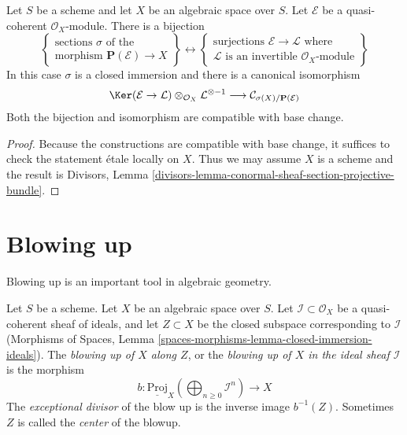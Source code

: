 \begin{lemma}
\label{lemma-conormal-sheaf-section-projective-bundle}
Let $S$ be a scheme and let $X$ be an algebraic space over $S$.
Let $\mathcal{E}$ be a quasi-coherent $\mathcal{O}_X$-module.
There is a bijection
$$
\left\{
\begin{matrix}
\text{sections }\sigma\text{ of the } \\
\text{morphism } \mathbf{P}(\mathcal{E}) \to X
\end{matrix}
\right\}
\leftrightarrow
\left\{
\begin{matrix}
\text{surjections }\mathcal{E} \to \mathcal{L}\text{ where} \\
\mathcal{L}\text{ is an invertible }\mathcal{O}_X\text{-module}
\end{matrix}
\right\}
$$
In this case $\sigma$ is a closed immersion and there is a canonical
isomorphism
$$
\Ker(\mathcal{E} \to \mathcal{L})
\otimes_{\mathcal{O}_X} \mathcal{L}^{\otimes -1}
\longrightarrow
\mathcal{C}_{\sigma(X)/\mathbf{P}(\mathcal{E})}
$$
Both the bijection and isomorphism are compatible with base change.
\end{lemma}

\begin{proof}
Because the constructions are compatible with base change, it suffices to
check the statement \'etale locally on $X$. Thus we may assume $X$ is
a scheme and the result is
Divisors, Lemma \ref{divisors-lemma-conormal-sheaf-section-projective-bundle}.
\end{proof}






\section{Blowing up}
\label{section-blowing-up}

\noindent
Blowing up is an important tool in algebraic geometry.

\begin{definition}
\label{definition-blow-up}
Let $S$ be a scheme. Let $X$ be an algebraic space over $S$.
Let $\mathcal{I} \subset \mathcal{O}_X$ be a quasi-coherent sheaf
of ideals, and let $Z \subset X$ be the closed subspace corresponding
to $\mathcal{I}$
(Morphisms of Spaces, Lemma
\ref{spaces-morphisms-lemma-closed-immersion-ideals}).
The {\it blowing up of $X$ along $Z$}, or the
{\it blowing up of $X$ in the ideal sheaf $\mathcal{I}$} is
the morphism
$$
b :
\underline{\text{Proj}}_X
\left(\bigoplus\nolimits_{n \geq 0} \mathcal{I}^n\right)
\longrightarrow
X
$$
The {\it exceptional divisor} of the blow up is the inverse image
$b^{-1}(Z)$. Sometimes $Z$ is called the {\it center} of the blowup.
\end{definition}

